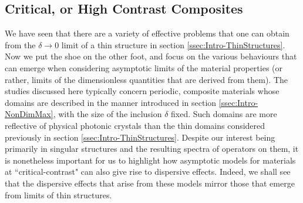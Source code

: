 \subsection{Critical, or High Contrast Composites} \label{ssec:Intro-CritContrast}
We have seen that there are a variety of effective problems that one can obtain from the $\delta\rightarrow0$ limit of a thin structure in section \ref{ssec:Intro-ThinStructures}.
Now we put the shoe on the other foot, and focus on the various behaviours that can emerge when considering asymptotic limits of the material properties (or rather, limits of the dimensionless quantities that are derived from them).
The studies discussed here typically concern periodic, composite materials whose domains are described in the manner introduced in section \ref{ssec:Intro-NonDimMax}, with the size of the inclusion $\delta$ fixed.
Such domains are more reflective of physical photonic crystals than the thin domains considered previously in section \ref{ssec:Intro-ThinStructures}.
Despite our interest being primarily in singular structures and the resulting spectra of operators on them, it is nonetheless important for us to highlight how asymptotic models for materials at ``critical-contrast" can also give rise to dispersive effects.
Indeed, we shall see that the dispersive effects that arise from these models mirror those that emerge from limits of thin structures.

